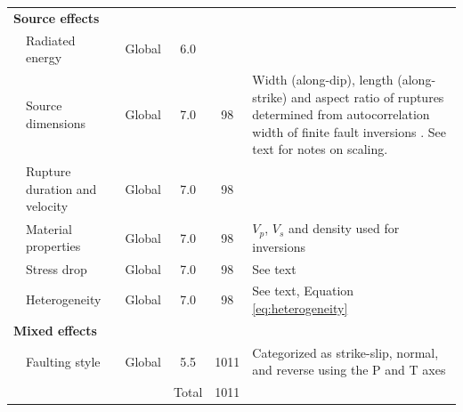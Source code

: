 \documentclass[draft, jgrga]{agujournal2018}
\begin{document}
\begin{table}[]
\begin{threeparttable}
\begin{tabular}{@{}lp{2cm}p{1cm}ccp{6.5cm}@{}}
\multicolumn{2}{l}{\textbf{Source effects}} &              &       &      &                                                                                                                                                                                                            \\
          & Radiated energy\tnote{5}        & Global       & 6.0   &      &                                                                                                                                                                                                            \\
          & Source dimensions\tnote{6}      & Global       & 7.0   & 98   & Width (along-dip), length (along-strike) and aspect ratio of ruptures determined from autocorrelation width of finite fault inversions \citep[following][]{mai2000}. See text for notes on scaling.                                 \\
          & Rupture duration and velocity\tnote{7}& Global  & 7.0   & 98   &                                                                                                                                                                                                            \\
          & Material properties\tnote{7}    & Global       & 7.0   & 98   & $V_p$, $V_s$ and density used for inversions                                                                                                                                                         \\
          & Stress drop\tnote{6}            & Global       & 7.0   & 98   & See text                                                                                                                                                                                                  \\
          & Heterogeneity\tnote{6}          & Global       & 7.0   & 98   & See text, Equation \ref{eq:heterogeneity}                                                                                                                                                                                                   \\
\multicolumn{2}{l}{\textbf{Mixed effects}}  &              &       &      &                                                                                                                                                                                                            \\
          & Faulting style\tnote{8}         & Global       & 5.5   & 1011 & Categorized as strike-slip, normal, and reverse using the P and T axes                                                                                                                                     \\ \midrule
          &                                 &              & Total & 1011 &
\end{tabular}%


\end{threeparttable}
\end{table}
\end{document}
